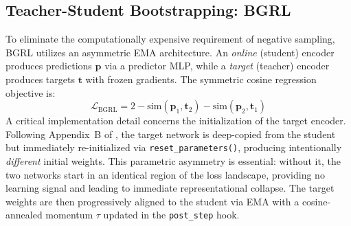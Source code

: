 \documentclass[conference]{IEEEtran}
\begin{document}
\subsection{Teacher-Student Bootstrapping: BGRL}
To eliminate the computationally expensive requirement of negative sampling, BGRL \cite{bgrl} utilizes an asymmetric EMA architecture. An \textit{online} (student) encoder produces predictions $\bm{p}$ via a predictor MLP, while a \textit{target} (teacher) encoder produces targets $\bm{t}$ with frozen gradients. The symmetric cosine regression objective is:
\begin{equation}
\mathcal{L}_{\text{BGRL}} = 2 - \text{sim}(\bm{p}_1, \bm{t}_2) - \text{sim}(\bm{p}_2, \bm{t}_1)
\end{equation}
A critical implementation detail concerns the initialization of the target encoder. Following Appendix~B of \cite{bgrl}, the target network is deep-copied from the student but immediately re-initialized via \texttt{reset\_parameters()}, producing intentionally \textit{different} initial weights. This parametric asymmetry is essential: without it, the two networks start in an identical region of the loss landscape, providing no learning signal and leading to immediate representational collapse. The target weights are then progressively aligned to the student via EMA with a cosine-annealed momentum $\tau$ updated in the \texttt{post\_step} hook.
\end{document}
